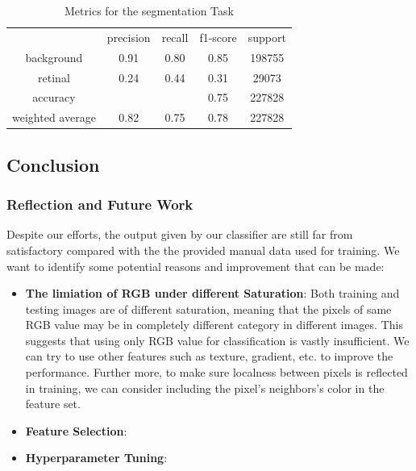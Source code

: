 \documentclass[12pt,letterpaper]{article}
\begin{document}
    \begin{table}[H]
        \caption{Metrics for the segmentation Task}
        \begin{tabular}{ccccc}
                         & precision & recall & f1-score & support \\
        background       & 0.91      & 0.80   & 0.85     & 198755  \\
        retinal          & 0.24      & 0.44   & 0.31     & 29073   \\
        accuracy         &           &        & 0.75     & 227828  \\
        weighted average & 0.82      & 0.75   & 0.78     & 227828  
        \end{tabular}
    \end{table}




\subsection{Conclusion}



\subsubsection{Reflection and Future Work}
Despite our efforts, the output given by our classifier are still far from satisfactory compared with the the provided manual data used for training. We want to identify some potential reasons and improvement that can be made:
\begin{itemize}
    \item \textbf{The limiation of RGB under different Saturation}: Both training and testing images are of different saturation, meaning that the pixels of same RGB value may be in completely different category in different images. This suggests that using only RGB value for classification is vastly insufficient. We can try to use other features such as texture, gradient, etc. to improve the performance. Further more, to make sure localness between pixels is reflected in training, we can consider including the pixel's neighbors's color in the feature set.

    \item \textbf{Feature Selection}: 
    
    \item \textbf{Hyperparameter Tuning}: 
\end{itemize}
\end{document}
